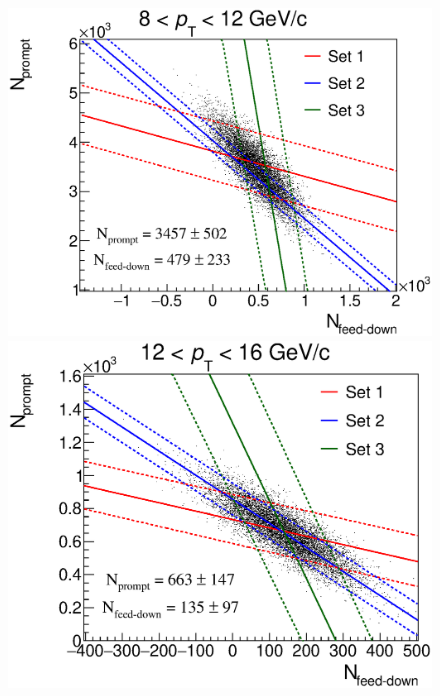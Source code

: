 \documentclass[b5paper,10pt,twoside,oldstyle,classica]{toptesi}
\begin{document}
\begin{figure}[h]
\begin{center}
\hspace{0cm}
{\includegraphics[scale = 0.25]{LinesDisp_8-12.eps}}
\vspace{0cm}
{\includegraphics[scale = 0.25]{LinesDisp_12-16.eps}}
\end{center}
\end{figure}
\clearpage
\end{document}
